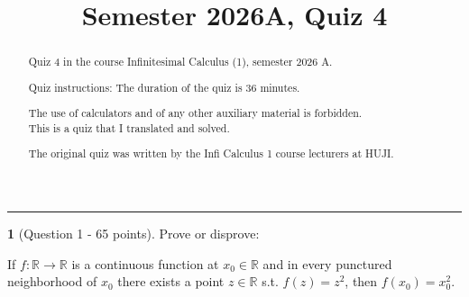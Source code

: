 \documentclass[english]{article}
\theoremstyle{definition}
\newtheorem*{problem*}{\protect\problemname}
\providecommand{\problemname}{Problem}
\begin{document}
\title{{\Large\vspace{-6em}Semester 2026A, Quiz 4\vspace{-3em}}}
\maketitle
\begin{abstract}
Quiz 4 in the course Infinitesimal Calculus (1), semester 2026 A.

Quiz instructions: The duration of the quiz is 36 minutes.

The use of calculators and of any other auxiliary material is forbidden.
\\

This is a quiz that I translated and solved.

The original quiz was written by the Infi Calculus 1 course lecturers
at HUJI.
\end{abstract}
\medskip{}

\rule[0.5ex]{1\columnwidth}{1pt}

\medskip{}

\begin{problem*}[Question 1 - 65 points]
 Prove or disprove:

If $f:\mathbb{R}\to\mathbb{R}$ is a continuous function at $x_{0}\in\mathbb{R}$
and in every punctured neighborhood of $x_{0}$ there exists a point
$z\in\mathbb{R}$ s.t. $f(z)=z^{2}$, then $f(x_{0})=x_{0}^{2}$.
\end{problem*}
\medskip{}
\end{document}
